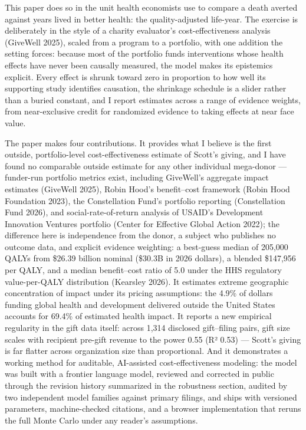 \documentclass[
  11pt,
  letterpaper,
  DIV=11,
  numbers=noendperiod]{scrartcl}
\begin{document}
This paper does so in the unit health economists use to compare a death
averted against years lived in better health: the quality-adjusted
life-year. The exercise is deliberately in the style of a charity
evaluator's cost-effectiveness analysis (GiveWell 2025), scaled from a
program to a portfolio, with one addition the setting forces: because
most of the portfolio funds interventions whose health effects have
never been causally measured, the model makes its epistemics explicit.
Every effect is shrunk toward zero in proportion to how well its
supporting study identifies causation, the shrinkage schedule is a
slider rather than a buried constant, and I report estimates across a
range of evidence weights, from near-exclusive credit for randomized
evidence to taking effects at near face value.

The paper makes four contributions. It provides what I believe is the
first outside, portfolio-level cost-effectiveness estimate of Scott's
giving, and I have found no comparable outside estimate for any other
individual mega-donor --- funder-run portfolio metrics exist, including
GiveWell's aggregate impact estimates (GiveWell 2025), Robin Hood's
benefit--cost framework (Robin Hood Foundation 2023), the Constellation
Fund's portfolio reporting (Constellation Fund 2026), and
social-rate-of-return analysis of USAID's Development Innovation
Ventures portfolio (Center for Effective Global Action 2022); the
difference here is independence from the donor, a subject who publishes
no outcome data, and explicit evidence weighting: a best-guess median of
205,000 QALYs from \$26.39 billion nominal (\$30.3B in 2026 dollars), a
blended \$147,956 per QALY, and a median benefit--cost ratio of 5.0
under the HHS regulatory value-per-QALY distribution (Kearsley 2026). It
estimates extreme geographic concentration of impact under its pricing
assumptions: the 4.9\% of dollars funding global health and development
delivered outside the United States accounts for 69.4\% of estimated
health impact. It reports a new empirical regularity in the gift data
itself: across 1,314 disclosed gift--filing pairs, gift size scales with
recipient pre-gift revenue to the power 0.55 (R² 0.53) --- Scott's
giving is far flatter across organization size than proportional. And it
demonstrates a working method for auditable, AI-assisted
cost-effectiveness modeling: the model was built with a frontier
language model, reviewed and corrected in public through the revision
history summarized in the robustness section, audited by two independent
model families against primary filings, and ships with versioned
parameters, machine-checked citations, and a browser implementation that
reruns the full Monte Carlo under any reader's assumptions.
\end{document}
